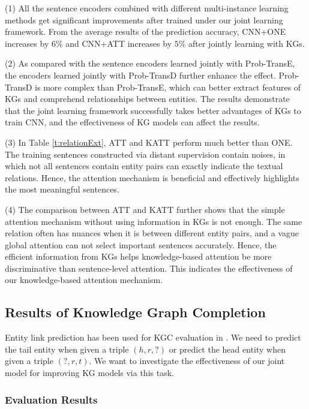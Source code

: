 \documentclass[letterpaper]{article} %
\begin{document}
(1) All the sentence encoders combined with different multi-instance learning methods get significant improvements after trained under our joint learning framework. From the average results of the prediction accuracy, CNN+ONE increases by $6\%$ and CNN+ATT increases by $5\%$ after jointly learning with KGs. 

(2) As compared with the sentence encoders learned jointly with Prob-TransE, the encoders learned jointly with Prob-TransD further enhance the effect. Prob-TransD is more complex than Prob-TransE, which can better extract features of KGs and comprehend relationships between entities. The results demonstrate that the joint learning framework successfully takes better advantages of KGs to train CNN, and the effectiveness of KG models can affect the results. 

(3) In Table \ref{t:relationExt}, ATT and KATT perform much better than ONE. The training sentences constructed via distant supervision contain noises, in which not all sentences contain entity pairs can exactly indicate the textual relations. Hence, the attention mechanism is beneficial and effectively highlights the most meaningful sentences. 

(4) The comparison between ATT and KATT further shows that the simple attention mechanism without using information in KGs is not enough. The same relation often has nuances when it is between different entity pairs, and a vague global attention can not select important sentences accurately. Hence, the efficient information from KGs helps knowledge-based attention be more discriminative than sentence-level attention. This indicates the effectiveness of our knowledge-based attention mechanism.





\subsection{Results of Knowledge Graph Completion}

Entity link prediction has been used for KGC evaluation in \cite{bordes2013translating}. We need to predict the tail entity when given a triple $(h, r, ?)$ or predict the head entity when given a triple $(?, r ,t)$. We want to investigate the effectiveness of our joint model for improving KG models via this task.

\subsubsection{Evaluation Results}
\end{document}
